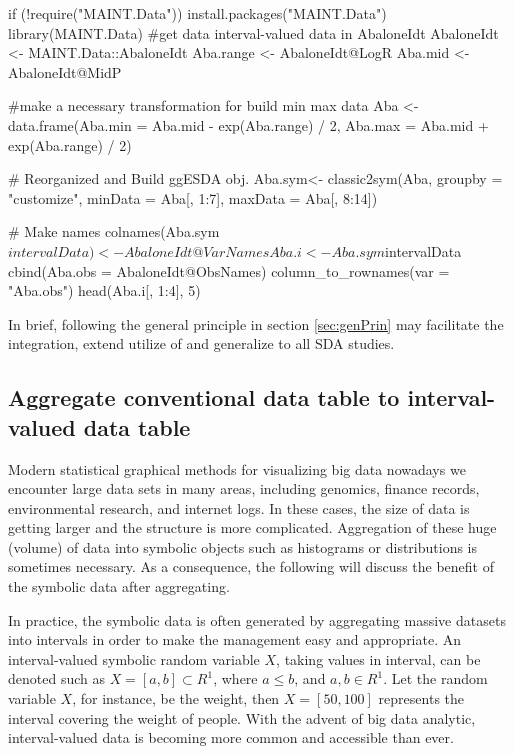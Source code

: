 \documentclass[article]{jss}
\begin{document}
\begin{CodeChunk}
\begin{CodeInput}
if (!require("MAINT.Data")) install.packages("MAINT.Data")
library(MAINT.Data)
#get data interval-valued data in AbaloneIdt
AbaloneIdt <- MAINT.Data::AbaloneIdt
Aba.range <- AbaloneIdt@LogR
Aba.mid <- AbaloneIdt@MidP


#make a necessary transformation for build min max data
Aba <- data.frame(Aba.min = Aba.mid - exp(Aba.range) / 2,
                  Aba.max = Aba.mid + exp(Aba.range) / 2)


# Reorganized and Build ggESDA obj.
Aba.sym<- classic2sym(Aba, groupby = "customize",
                      minData = Aba[, 1:7],
                      maxData = Aba[, 8:14])


# Make names
colnames(Aba.sym$intervalData) <- AbaloneIdt@VarNames
Aba.i <- Aba.sym$intervalData %
  cbind(Aba.obs = AbaloneIdt@ObsNames) %
  column_to_rownames(var = "Aba.obs")
head(Aba.i[, 1:4], 5)
\end{CodeInput}
\end{CodeChunk}

In brief, following the general principle in section \ref{sec:genPrin} may facilitate the integration, extend utilize of  and generalize to all SDA studies.


\subsection{Aggregate conventional data table to interval-valued data table}\label{sec:aggregation}

Modern statistical graphical methods for visualizing big data nowadays
we encounter large data sets in many areas, including genomics,
finance records, environmental research, and internet logs. In these
cases, the size of data is getting larger and the structure is more
complicated. Aggregation of these huge (volume) of data into symbolic
objects such as histograms or distributions is sometimes necessary. As
a consequence, the following will discuss the benefit of the symbolic
data after aggregating.

In practice, the symbolic data is often generated by aggregating
massive datasets into intervals in order to make the management easy
and appropriate. An interval-valued symbolic random variable $X$,
taking values in interval, can be denoted such as $X = [a,b] \subset 
R^{1}$, where $a \leq b$, and $a, b \in R^{1}$. Let the random
variable $X$, for instance, be the weight, then $X = [50,100]$
represents the interval covering the weight of people. With the advent
of big data analytic, interval-valued data is becoming more common and
accessible than ever. 
\end{document}
